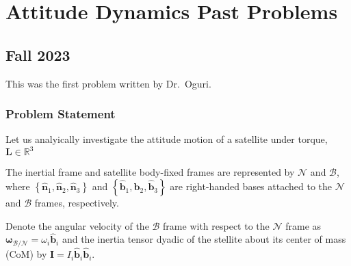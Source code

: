 \documentclass[
]{article}
\let\oldsection\section
\renewcommand\section{\clearpage\oldsection}
\begin{document}
\section{Attitude Dynamics Past
Problems}\label{attitude-dynamics-past-problems}

\subsection{Fall 2023}\label{fall-2023-1}

This was the first problem written by Dr.~Oguri.

\subsubsection{Problem Statement}\label{problem-statement-4}

Let us analyically investigate the attitude motion of a satellite under
torque, \(\boldsymbol{L} \in \mathbb{R}^3\)

The inertial frame and satellite body-fixed frames are represented by
\(\mathcal{N}\) and \(\mathcal{B}\), where
\(\left\{\hat{\boldsymbol{n}}_1, \hat{\boldsymbol{n}}_2, \hat{\boldsymbol{n}}_3\right\}\)
and
\(\left\{\hat{\boldsymbol{b}}_1, \hat{\boldsymbol{b}}_2, \hat{\boldsymbol{b}}_3\right\}\)
are right-handed bases attached to the \(\mathcal{N}\) and
\(\mathcal{B}\) frames, respectively.

Denote the angular velocity of the \(\mathcal{B}\) frame with respect to
the \(\mathcal{N}\) frame as
\(\boldsymbol{\omega}_\mathcal{B/N} = \omega_i \hat{\boldsymbol{b}}_i\)
and the inertia tensor dyadic of the stellite about its center of mass
(CoM) by
\(\boldsymbol{I} = I_i \hat{\boldsymbol{b}}_i \hat{\boldsymbol{b}}_i\).
\end{document}
